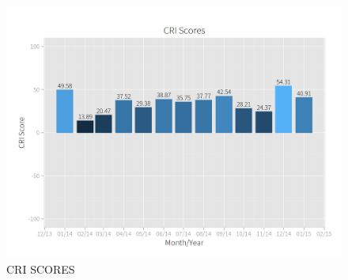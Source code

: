 \documentclass[SDSUThesis.tex]{subfiles}
\begin{document}
            \begin{figure}[ht]
                \centering
                \includegraphics[scale=.3]{images/cri_scores.png}
                \caption{CRI SCORES}
                \label{fig:cri-scores}
            \end{figure}


\end{document}
